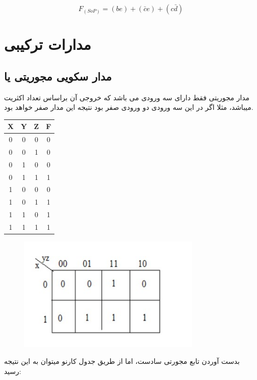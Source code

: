 \documentclass[20pt, a4paper]{article}
\begin{document}
\begin{equation}
	F_{(SoP)} = (be)+(\bar{c}e) + (c\bar{d})
\end{equation}
\newpage

\section{مدارات ترکیبی}

\subsection{مدار سکویی مجوریتی یا }
مدار مجوریتی فقط دارای سه ورودی می باشد که خروجی آن براساس تعداد
اکثریت میباشد، مثلا اگر در این سه ورودی دو ورودی صفر بود نتیجه این مدار
صفر خواهد بود.

\hfill \break

\begin{LTR}
	\begin{tabular}{ c c c | c }
		X & Y & Z & F \\
		\hline
		0 & 0 & 0 &  0\\ 				
		0 & 0 & 1 &  0\\
		0 & 1 & 0 &  0\\
		0 & 1 & 1 &  1\\
		1 & 0 & 0 &  0\\
		1 & 0 & 1 &  1\\
		1 & 1 & 0 &  1\\
		1 & 1 & 1 &  1\\	
	\end{tabular}
\end{LTR}
\hfill \break

\begin{figure}[htbp]\centering
	\centerline{\includegraphics[width=250pt]{img/lastest/majority.jpg}}
\end{figure}


\newpage
بدست آوردن تابع مجورتی سادست، اما از طریق جدول کارنو میتوان به این نتیجه رسید:
\end{document}
